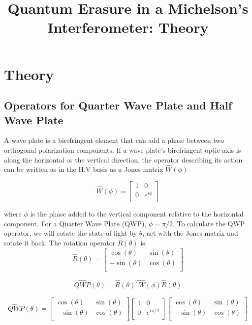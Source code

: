 \documentclass{article}
\begin{document}
\title{Quantum Erasure in a Michelson's Interferometer: Theory}
\maketitle


\section{Theory}

\subsection{Operators for Quarter Wave Plate and Half Wave Plate}
\hspace{\parindent} A wave plate is a birefringent element that can add a phase between two orthogonal polarization components. If a wave plate's birefringent optic axis is along the horizontal or the vertical direction, the operator describing its action can be written as in the {H,V} basis as a Jones matrix $\hat{W}(\phi)$

\[\hat{W}(\phi) = \begin{bmatrix}
1&0\\
0&e^{i\phi}\\
\end{bmatrix}\]


\begin{flushleft}{where $\phi$ is the phase added to the vertical component relative to the horizontal component.
For a Quarter Wave Plate (QWP), $\phi = \pi/2$. To calculate the QWP operator, we will rotate the state of light by $\theta$, act with the Jones matrix and rotate it back. The rotation operator $\hat{R}(\theta)$ is:}
\[\hat{R}(\theta) = \begin{bmatrix}
\cos(\theta)&\sin(\theta)\\
-\sin(\theta)&\cos(\theta)\\
\end{bmatrix}\]

\begin{gather*}
  \hat{QWP}(\theta) = \hat{R}(\theta)^T\hat{W}(\phi)\hat{R}(\theta)  
\end{gather*}

\end{flushleft}

\[\hat{QWP}(\theta) = \begin{bmatrix}
\cos(\theta)&\sin(\theta)\\
-\sin(\theta)&\cos(\theta)\\
\end{bmatrix}
\begin{bmatrix}
1&0\\
0&e^{i\pi/2}\\
\end{bmatrix}
\begin{bmatrix}
\cos(\theta)&\sin(\theta)\\
-\sin(\theta)&\cos(\theta)\\
\end{bmatrix}
\]
\end{document}
